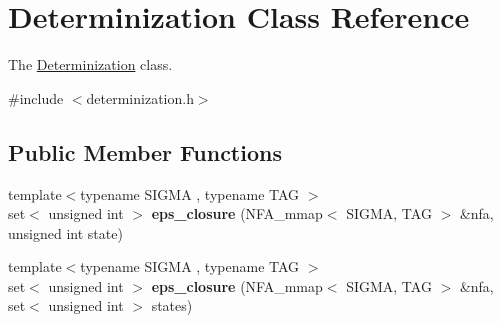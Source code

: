 \hypertarget{class_determinization}{}\section{Determinization Class Reference}
\label{class_determinization}


The \hyperlink{class_determinization}{Determinization} class.  




{\ttfamily \#include $<$determinization.\+h$>$}

\subsection*{Public Member Functions}
\begin{DoxyCompactItemize}
\item 
{\footnotesize template$<$typename S\+I\+G\+MA , typename T\+AG $>$ }\\set$<$ unsigned int $>$ {\bfseries eps\+\_\+closure} (N\+F\+A\+\_\+mmap$<$ S\+I\+G\+MA, T\+AG $>$ \&nfa, unsigned int state)\hypertarget{class_determinization_a915518c4e27962c500b07ac8a8ad22bf}{}\label{class_determinization_a915518c4e27962c500b07ac8a8ad22bf}

\item 
{\footnotesize template$<$typename S\+I\+G\+MA , typename T\+AG $>$ }\\set$<$ unsigned int $>$ {\bfseries eps\+\_\+closure} (N\+F\+A\+\_\+mmap$<$ S\+I\+G\+MA, T\+AG $>$ \&nfa, set$<$ unsigned int $>$ states)\hypertarget{class_determinization_a8cba41e0bc796ffdead6d766100b1111}{}\label{class_determinization_a8cba41e0bc796ffdead6d766100b1111}

\end{DoxyCompactItemize}
